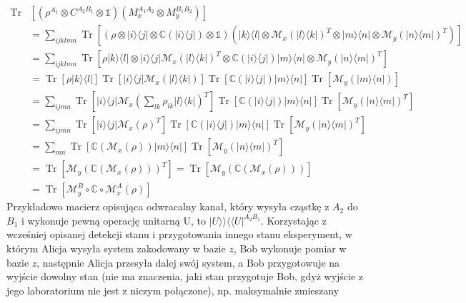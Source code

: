 \documentclass[10pt]{article} %
\DeclareMathOperator{\Trs}{Tr}
\newcommand{\Ket}[1]{|#1\rangle}
\newcommand{\Bra}[1]{\langle#1|}
\newcommand{\BBra}[1]{\langle\langle#1|}
\newcommand{\KKet}[1]{|#1\rangle\rangle}
\newcommand{\I}{\mathbb{1}}
\begin{document}
\begin{equation}
\begin{split}
\Trs&\left[ \left(\rho^{A_1} \otimes C^{A_2B_1} \otimes \I \right)\left(M_x^{A_1A_2}\otimes M_y^{B_1B_2}\right)\right] \\
&= \sum_{ijklmn} \Trs \left[ \left(\rho \otimes \Ket{i}\Bra{j} \otimes \mathds{C}(\Ket{i}\Bra{j}) \otimes \I\right)\left(\Ket{k}\Bra{l} \otimes \mathcal{M}_x(\Ket{l}\Bra{k})^T \otimes \Ket{m}\Bra{n} \otimes \mathcal{M}_y(\Ket{n}\Bra{m})^T\right)\right] \\
&= \sum_{ijklmn} \Trs \left[ \rho \Ket{k}\Bra{l} \otimes \Ket{i}\Bra{j}\mathcal{M}_x(\Ket{l}\Bra{k})^T \otimes \mathds{C}(\Ket{i}\Bra{j})\Ket{m}\Bra{n} \otimes \mathcal{M}_y(\Ket{n}\Bra{m})^T\right] \\
&= \Trs\left[\rho\Ket{k}\Bra{l}\right] \Trs\left[\Ket{i}\Bra{j}\mathcal{M}_x(\Ket{l}\Bra{k})\right] \Trs\left[\mathds{C}(\Ket{i}\Bra{j}) \Ket{m}\Bra{n}\right] \Trs\left[\mathcal{M}_y(\Ket{m}\Bra{n})\right] \\
&= \sum_{ijmn}  \Trs\left[\Ket{i}\Bra{j}\mathcal{M}_x(\sum_{lk} \rho_{lk} \Ket{l}\Bra{k})^T\right] \Trs\left[\mathds{C}(\Ket{i}\Bra{j}) \Ket{m}\Bra{n}\right] \Trs\left[\mathcal{M}_y(\Ket{n}\Bra{m})^T\right] \\
&= \sum_{ijmn}  \Trs\left[\Ket{i}\Bra{j}\mathcal{M}_x(\rho)^T\right] \Trs\left[\mathds{C}(\Ket{i}\Bra{j}) \Ket{m}\Bra{n}\right] \Trs\left[\mathcal{M}_y(\Ket{n}\Bra{m})^T\right] \\
&= \sum_{mn} \Trs \left[ \mathds{C}(\mathcal{M}_x(\rho))\Ket{m}\Bra{n}\right]\Trs\left[\mathcal{M}_y(\Ket{n}\Bra{m})^T\right] \\
&=  \Trs\left[ \mathcal{M}_y (\mathds{C}(\mathcal{M}_x(\rho)))^T\right] = \Trs\left[ \mathcal{M}_y (\mathds{C}(\mathcal{M}_x(\rho)))\right] \\
&=\Trs \left[ \mathcal{M}_y^B \circ \mathds{C} \circ \mathcal{M}_x^A(\rho)\right]
\end{split}
\end{equation}
Przykładowo macierz opisująca odwracalny kanał, który wysyła cząstkę z $A_2$ do $B_1$ i wykonuje pewną operację unitarną U, to $\KKet{U}\BBra{U}^{A_2B_1}$. Korzystając z wcześniej opisanej detekcji stanu i przygotowania innego stanu eksperyment, w którym Alicja wysyła system zakodowany w bazie $z$, Bob wykonuje pomiar w bazie $z$, następnie Alicja przesyła dalej swój system, a Bob przygotowuje na wyjście dowolny stan (nie ma znaczenia, jaki stan przygotuje Bob, gdyż wyjście z jego laboratorium nie jest z niczym połączone), np. maksymalnie zmieszany
\end{document}
